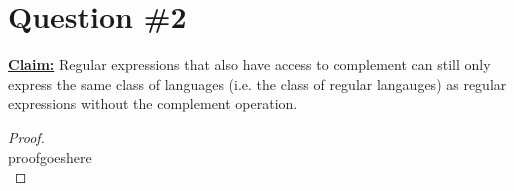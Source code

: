 \documentclass[12pt]{article}
\begin{document}
\section*{Question \#2}
\textbf{\underline{Claim:}} Regular expressions that also have access to complement can still only express the same class of languages (i.e. the class of regular langauges) as regular expressions without the complement operation.
\begin{proof}
\leavevmode\\
    proofgoeshere \\
\end{proof}
\pagebreak
\end{document}
